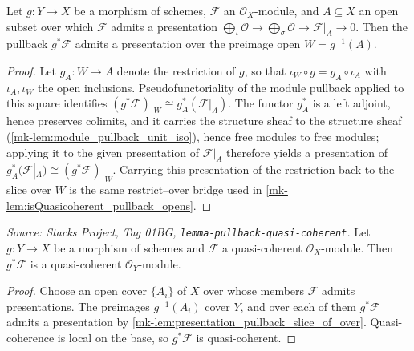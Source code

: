 \begin{lemma}\label{mk-lem:presentation_pullback_slice_of_over}
  \leanok

  Let \(g : Y \to X\) be a morphism of schemes, \(\mathcal{F}\) an \(\mathcal{O}_X\)-module,
  and \(A \subseteq X\) an open subset over which \(\mathcal{F}\) admits a presentation
  \(\bigoplus_{\iota}\mathcal{O} \to \bigoplus_{\sigma}\mathcal{O} \to \mathcal{F}|_A \to 0\).
  Then the pullback \(g^*\mathcal{F}\) admits a presentation over the preimage open
  \(W = g^{-1}(A)\).
\end{lemma}
\begin{proof}
  \leanok{}
  Let \(g_A : W \to A\) denote the restriction of \(g\), so that
  \(\iota_W \circ g = g_A \circ \iota_A\) with \(\iota_A, \iota_W\) the open inclusions.
  Pseudofunctoriality of the module pullback applied to this square identifies
  \((g^*\mathcal{F})|_W \cong g_A^*(\mathcal{F}|_A)\). The functor \(g_A^*\) is a left
  adjoint, hence preserves colimits, and it carries the structure sheaf to the structure
  sheaf (\ref{mk-lem:module_pullback_unit_iso}), hence free modules to free modules; applying it to
  the given presentation of \(\mathcal{F}|_A\) therefore yields a presentation of
  \(g_A^*(\mathcal{F}|_A) \cong (g^*\mathcal{F})|_W\). Carrying this presentation of the
  restriction back to the slice over \(W\) is the same restrict--over bridge used in
  \ref{mk-lem:isQuasicoherent_pullback_opens}.
\end{proof}

\begin{lemma}\label{mk-lem:pullback_isQuasicoherent_hom}
  \leanok

  \textit{Source: Stacks Project, Tag 01BG, \texttt{lemma-pullback-quasi-coherent}.}
  Let \(g : Y \to X\) be a morphism of schemes and \(\mathcal{F}\) a quasi-coherent
  \(\mathcal{O}_X\)-module. Then \(g^*\mathcal{F}\) is a quasi-coherent
  \(\mathcal{O}_Y\)-module.
\end{lemma}
\begin{proof}
  \leanok{}
  Choose an open cover \(\{A_i\}\) of \(X\) over whose members \(\mathcal{F}\) admits
  presentations. The preimages \(g^{-1}(A_i)\) cover \(Y\), and over each of them
  \(g^*\mathcal{F}\) admits a presentation by
  \ref{mk-lem:presentation_pullback_slice_of_over}. Quasi-coherence is local on the base, so
  \(g^*\mathcal{F}\) is quasi-coherent.
\end{proof}

